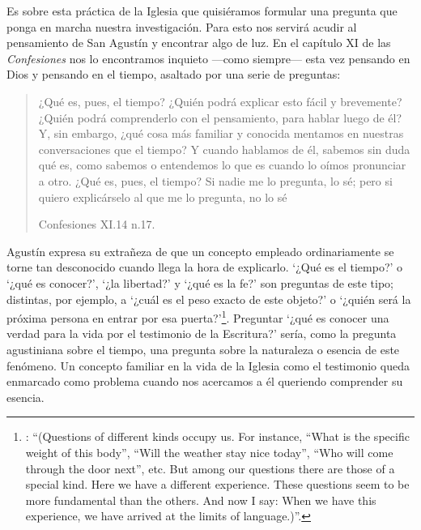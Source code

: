 


Es sobre esta práctica de la Iglesia que quisiéramos formular una pregunta que ponga en marcha nuestra investigación. Para esto nos servirá acudir al pensamiento de San Agustín y encontrar algo de luz. En el capítulo XI de las \emph{Confesiones} nos lo encontramos inquieto ---como siempre--- esta vez pensando en Dios y pensando en el tiempo, asaltado por una serie de preguntas:

\blockquote[Confesiones XI.14 n.17.]{¿Qué es, pues, el tiempo? ¿Quién podrá explicar esto fácil y brevemente? ¿Quién podrá comprenderlo con el pensamiento, para hablar luego de él? Y, sin embargo, ¿qué cosa más familiar y conocida mentamos en nuestras conversaciones que el tiempo? Y cuando hablamos de él, sabemos sin duda qué es, como sabemos o entendemos lo que es cuando lo oímos pronunciar a otro. ¿Qué es, pues, el tiempo? Si nadie me lo pregunta, lo sé; pero si quiero explicárselo al que me lo pregunta, no lo sé}.

Agustín expresa su extrañeza de que un concepto empleado ordinariamente se torne tan desconocido cuando llega la hora de explicarlo. \enquote*{¿Qué es el tiempo?} o \enquote*{¿qué es conocer?}, \enquote*{¿la libertad?} y \enquote*{¿qué es la fe?} son preguntas de este tipo; distintas, por ejemplo, a \enquote*{¿cuál es el peso exacto de este objeto?} o \enquote*{¿quién será la próxima persona en entrar por esa puerta?}\footnote{\Cite[Cf.][304]{wittgenstein2005bt}: \enquote{(Questions of different kinds occupy us. For instance, ``What is the specific weight of this body'', ``Will the weather stay nice today'', ``Who will come through the door next'', etc. But among our questions there are those of a special kind. Here we have a different experience. These questions seem to be more fundamental than the others. And now I say: When we have this experience, we have arrived at the limits of language.)}.}. Preguntar \enquote*{¿qué es conocer una verdad para la vida por el testimonio de la Escritura?} sería, como la pregunta agustiniana sobre el tiempo, una pregunta sobre la naturaleza o esencia de este fenómeno. Un concepto familiar en la vida de la Iglesia como el testimonio queda enmarcado como problema cuando nos acercamos a él queriendo comprender su esencia.

